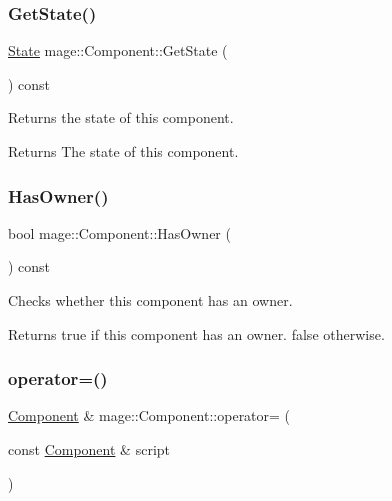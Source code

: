 \subsubsection{\texorpdfstring{Get\+State()}{GetState()}}
{\footnotesize\ttfamily \hyperlink{namespacemage_ae47d13d8477ee94893b9a3947d28eebc}{State} mage\+::\+Component\+::\+Get\+State (\begin{DoxyParamCaption}{ }\end{DoxyParamCaption}) const\hspace{0.3cm}{\ttfamily [noexcept]}}

Returns the state of this component.

\begin{DoxyReturn}{Returns}
The state of this component. 
\end{DoxyReturn}
\hypertarget{classmage_1_1_component_a8e62e223bdacc3eebddc43f8ebc8c4d9}{}\label{classmage_1_1_component_a8e62e223bdacc3eebddc43f8ebc8c4d9} 
\subsubsection{\texorpdfstring{Has\+Owner()}{HasOwner()}}
{\footnotesize\ttfamily bool mage\+::\+Component\+::\+Has\+Owner (\begin{DoxyParamCaption}{ }\end{DoxyParamCaption}) const\hspace{0.3cm}{\ttfamily [noexcept]}}

Checks whether this component has an owner.

\begin{DoxyReturn}{Returns}
{\ttfamily true} if this component has an owner. {\ttfamily false} otherwise. 
\end{DoxyReturn}
\hypertarget{classmage_1_1_component_a69c2e920fb88323fa0fc5174671f4a01}{}\label{classmage_1_1_component_a69c2e920fb88323fa0fc5174671f4a01} 
\subsubsection{\texorpdfstring{operator=()}{operator=()}\hspace{0.1cm}{\footnotesize\ttfamily [1/2]}}
{\footnotesize\ttfamily \hyperlink{classmage_1_1_component}{Component} \& mage\+::\+Component\+::operator= (\begin{DoxyParamCaption}\item[{const \hyperlink{classmage_1_1_component}{Component} \&}]{script }\end{DoxyParamCaption})\hspace{0.3cm}{\ttfamily [noexcept]}}


